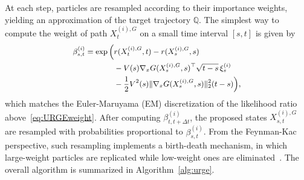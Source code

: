 \documentclass{article}
\theoremstyle{plain}
\theoremstyle{definition}
\theoremstyle{remark}
\newcommand{\Q}{{\mathbb{Q}}}
\begin{document}
At each step, particles are resampled according to their importance weights, yielding an approximation of the target trajectory $\Q$. The simplest way to compute the weight of path $X^{(i),G}_t$ on a small time interval $[s,t]$ is given by
\begin{equation}
\small
\begin{aligned}
    \beta_{s,t}^{(i)}
    =\exp\Big(
    &r(X_{t}^{\tiny(i),G},t) - r(X_s^{\tiny(i),G},s)\\
    &- V(s)\nabla_x G(X_s^{\tiny (i),G},s)^\top \sqrt{t-s}\,\xi_s^{(i)}\\
    &- \frac12 V^2(s) \|\nabla_x G(X_s^{\tiny(i),G},s)\|_2^2 (t-s)
    \Big),   
\end{aligned}
\label{eq:importance_weight}
\end{equation}
which matches the Euler-Maruyama (EM) discretization of the likelihood ratio above~\eqref{eq:URGEweight}. 
After computing $\beta_{t,t+\Delta t}^{(i)}$, the proposed states $X_{s,t}^{(i),G}$ are resampled with probabilities proportional to \(\beta_{s,t}^{(i)}\).  From the Feynman-Kac perspective, such resampling implements a birth-death mechanism, in which large-weight particles are replicated while low-weight ones are eliminated~\cite{DelMoral2004_FeynmanKac, DelMoral2000_BranchingIPS}. The overall algorithm is summarized in Algorithm~\ref{alg:urge}. 
\end{document}
